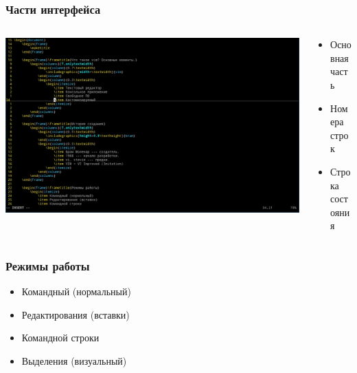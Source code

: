 \documentclass[aspectratio=169]{beamer}
\begin{document}
    \begin{frame}\frametitle{Части интерфейса}
        \begin{columns}[T,onlytextwidth]
            \begin{column}{0.7\textwidth}
                \includegraphics[width=\textwidth]{vim}
            \end{column}
            \begin{column}{0.3\textwidth}
                \begin{itemize}
                    \item Основная часть
                    \item Номера строк
                    \item Строка состояния
                \end{itemize}
            \end{column}
        \end{columns}
    \end{frame}

    \begin{frame}\frametitle{Режимы работы}
        \begin{itemize}
            \item Командный (нормальный)
            \item Редактирования (вставки)
            \item Командной строки
            \item Выделения (визуальный)
        \end{itemize}
    \end{frame}
\end{document}
